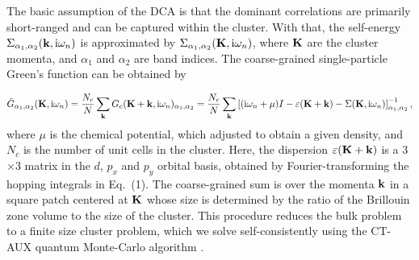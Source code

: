\documentclass[reprint,nofootinbib,nobibnotes,amsmath,amssymb,aps,prb,floatfix]{revtex4-2}
\newcommand{\beq}{\begin{equation}}
\newcommand{\eeq}{\end{equation}}
\begin{document}
The basic assumption of the DCA is that the dominant correlations are  primarily short-ranged and can be captured within the cluster. With that, the self-energy $\Sigma_{\alpha_1,\alpha_2}({\bf k},\text{i} \omega_n)$ is approximated by $\Sigma_{\alpha_1,\alpha_2}({\bf K},\text{i} \omega_n)$, where ${\bf K}$ are the cluster momenta, and $\alpha_1$ and $\alpha_2$ are band indices. The coarse-grained single-particle Green's function can be obtained by 
\begin{widetext}
\beq
\bar{G}_{\alpha_1,\alpha_2}({\bf K},\text{i}\omega_n)=\frac{N_c}{N}\sum_{\bf{k}}G_c({\bf K}+{\bf k},\text{i}\omega_n)_{\alpha_1,\alpha_2}=\frac{N_c}{N}\sum_{\bf{k}}\left[(\text{i}\omega_n+\mu)I-\varepsilon({\bf K}+{\bf k})-\Sigma({\bf K},\text{i}\omega_n)\right]^{-1}_{\alpha_1,\alpha_2},
\eeq
where $\mu$ is the chemical potential, which adjusted to obtain a given density, and $N_c$ is the number of unit cells in the cluster. Here, the dispersion $\varepsilon({\bf K+k})$ is a 3$\times$3 matrix in the $d$, $p_x$ and $p_y$ orbital basis, obtained by Fourier-transforming the hopping integrals in Eq.~(1). The coarse-grained sum is over the momenta $\bf{k}$ in a square patch centered at ${\bf K}$ whose size is determined by the ratio of the Brillouin zone volume to the size of the cluster. This procedure reduces the bulk problem to a finite size cluster problem, which we solve self-consistently using the CT-AUX quantum Monte-Carlo algorithm \cite{Gull}. 


\end{widetext}
\end{document}
